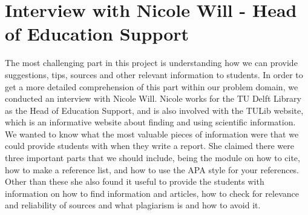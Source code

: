 \section{Interview with Nicole Will - Head of Education Support}
The most challenging part in this project is understanding how we can provide suggestions, tips, sources and other relevant information to students. In order to get a more detailed comprehension of this part within our problem domain, we conducted an interview with Nicole Will. Nicole works for the TU Delft Library as the Head of Education Support, and is also involved with the TULib website, which is an informative website about finding and using scientific information. We wanted to know what the most valuable pieces of information were that we could provide students with when they write a report. She claimed there were three important parts that we should include, being the module on how to cite\cite{tulib:howtocite}, how to make a reference list, and how to use the APA\cite{tulib:apa} style for your references. Other than these she also found it useful to provide the students with information on how to find information and articles, how to check for relevance and reliability of sources and what plagiarism is and how to avoid it.